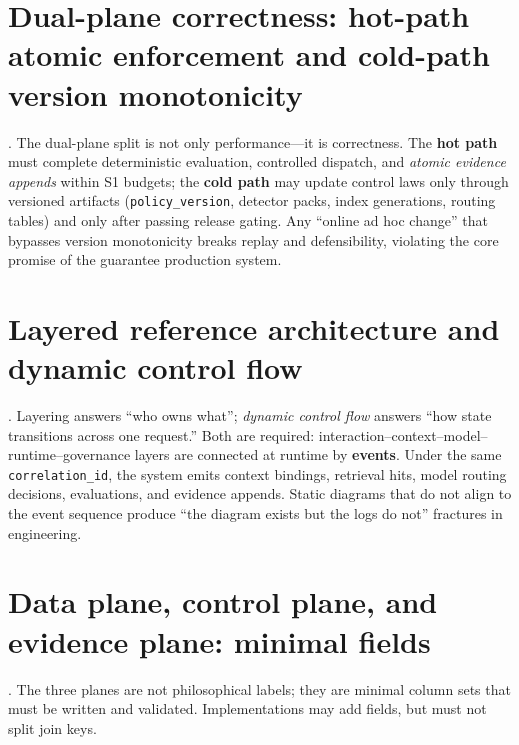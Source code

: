 \documentclass[11pt,a4paper]{report}
\begin{document}
\section{Dual-plane correctness: hot-path atomic enforcement and cold-path version monotonicity}
\ControlPlane{}. The dual-plane split is not only performance—it is correctness. The \textbf{hot path} must complete deterministic evaluation, controlled dispatch, and \emph{atomic evidence appends} within S1 budgets; the \textbf{cold path} may update control laws only through versioned artifacts (\texttt{policy\_version}, detector packs, index generations, routing tables) and only after passing release gating. Any “online ad hoc change” that bypasses version monotonicity breaks replay and defensibility, violating the core promise of the guarantee production system.

\section{Layered reference architecture and dynamic control flow}
\ControlPlane{}. Layering answers “who owns what”; \emph{dynamic control flow} answers “how state transitions across one request.” Both are required: interaction–context–model–runtime–governance layers are connected at runtime by \textbf{events}. Under the same \texttt{correlation\_id}, the system emits context bindings, retrieval hits, model routing decisions, \SafetyKernel{} evaluations, and evidence appends. Static diagrams that do not align to the event sequence produce “the diagram exists but the logs do not” fractures in engineering.

\section{Data plane, control plane, and evidence plane: minimal fields}
\ControlPlane{}. The three planes are not philosophical labels; they are minimal column sets that must be written and validated. Implementations may add fields, but must not split join keys.
\end{document}
